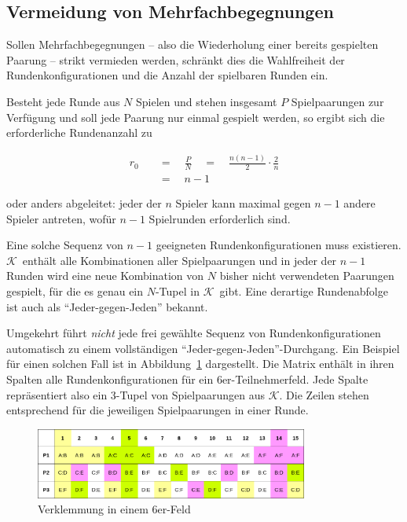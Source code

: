 \documentclass[DIV=15, 10pt]{scrartcl}
\newcommand{\KSet}{$\mathcal{K}$}
\begin{document}
\subsection{Vermeidung von Mehrfachbegegnungen}

Sollen Mehrfachbegegnungen -- also die Wiederholung einer bereits gespielten Paarung -- strikt vermieden werden, schränkt dies die Wahlfreiheit der Rundenkonfigurationen und die Anzahl der spielbaren Runden ein.

Besteht jede Runde aus $N$ Spielen und stehen insgesamt $P$ Spielpaarungen zur Verfügung und soll jede Paarung nur einmal gespielt werden, so ergibt sich die erforderliche Rundenanzahl zu

\begin{align}
r_0 \quad &= \quad \frac{P}{N} \quad = \quad \frac{n(n-1)}{2} \cdot \frac{2}{n} \nonumber \\[3mm]
&= \quad n - 1
\end{align}

oder anders abgeleitet: jeder der $n$ Spieler kann maximal gegen $n-1$ andere Spieler antreten, wofür $n-1$ Spielrunden erforderlich sind.

Eine solche Sequenz von $n-1$ geeigneten Rundenkonfigurationen muss existieren. \KSet\ enthält alle Kombinationen aller Spielpaarungen und in jeder der $n-1$ Runden wird eine neue Kombination von $N$ bisher nicht verwendeten Paarungen gespielt, für die es genau ein $N$-Tupel in \KSet\ gibt. Eine derartige Rundenabfolge ist auch als "`Jeder-gegen-Jeden"' bekannt.

Umgekehrt führt \emph{nicht} jede frei gewählte Sequenz von Rundenkonfigurationen automatisch zu einem vollständigen "`Jeder-gegen-Jeden"'-Durchgang. Ein Beispiel für einen solchen Fall ist in Abbildung~\ref{figDeadlock} dargestellt. Die Matrix enthält in ihren Spalten alle Rundenkonfigurationen für ein 6er-Teilnehmerfeld. Jede Spalte repräsentiert also ein 3-Tupel von Spielpaarungen aus \KSet. Die Zeilen stehen entsprechend für die jeweiligen Spielpaarungen in einer Runde.

\begin{figure}[hbtp]
\centering
\includegraphics[width=0.8\textwidth]{Verklemmung6_6er.png}
\caption{Verklemmung in einem 6er-Feld}
\label{figDeadlock}
\end{figure}
\end{document}
